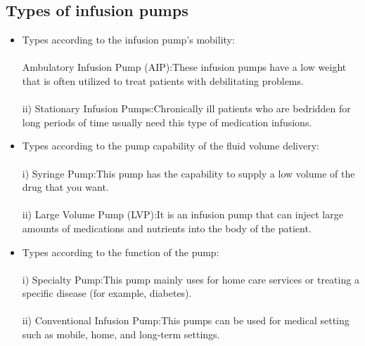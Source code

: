 \documentclass[12pt]{article}
\begin{document}
\subsection{Types of infusion pumps}
\begin{itemize}
 \item Types according to the infusion pump’s mobility:\\
 \\
 Ambulatory Infusion Pump (AIP):These infusion pumps have a low weight that is often utilized to treat patients with debilitating problems.\\
 \\
ii) Stationary Infusion Pumps:Chronically ill patients who are bedridden for long periods of time usually need this type of medication infusions.\\
\item Types according to the pump capability of the fluid volume delivery:\\
\\
i) Syringe Pump:This pump has the capability to supply a low volume of the drug that you want.\\
\\
ii) Large Volume Pump (LVP):It is an infusion pump that can inject large amounts of medications and nutrients into the body of the patient.\\
\item Types according to the function of the pump:\\
\\
i) Specialty Pump:This pump mainly uses for home care services or treating a specific disease (for example, diabetes).\\
\\
ii) Conventional Infusion Pump:This pumps can be used for medical setting such as mobile, home, and long-term settings.\\
\end{itemize}
\clearpage
\end{document}
